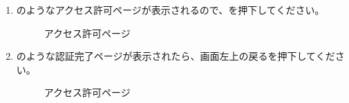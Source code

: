 \begin{enumerate}
                \newpage
                \item {}のようなアクセス許可ページが表示されるので、を押下してください。
                    \begin{figure}[htbp]
                        \centering
                        \caption{アクセス許可ページ}
                        \label{img:misskey5}
                    \end{figure}

                \newpage
                \item {}のような認証完了ページが表示されたら、画面左上の戻るを押下してください。
                    \begin{figure}[htbp]
                        \centering
                        \caption{アクセス許可ページ}
                        \label{img:misskey6}
                    \end{figure}


\end{enumerate}
